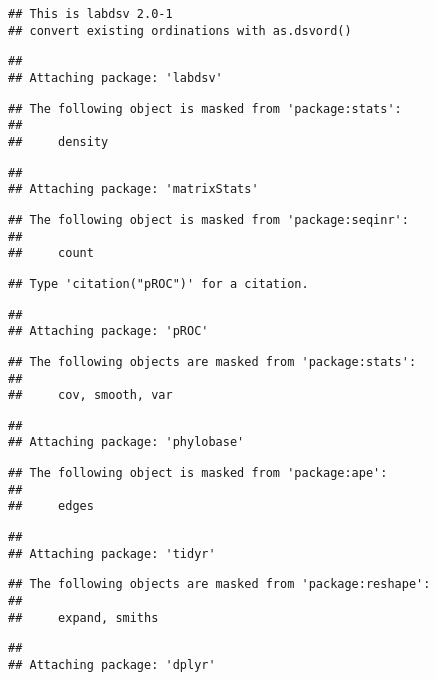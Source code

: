 \documentclass[
]{article}
\begin{document}
\begin{verbatim}
## This is labdsv 2.0-1
## convert existing ordinations with as.dsvord()
\end{verbatim}

\begin{verbatim}
## 
## Attaching package: 'labdsv'
\end{verbatim}

\begin{verbatim}
## The following object is masked from 'package:stats':
## 
##     density
\end{verbatim}

\begin{verbatim}
## 
## Attaching package: 'matrixStats'
\end{verbatim}

\begin{verbatim}
## The following object is masked from 'package:seqinr':
## 
##     count
\end{verbatim}

\begin{verbatim}
## Type 'citation("pROC")' for a citation.
\end{verbatim}

\begin{verbatim}
## 
## Attaching package: 'pROC'
\end{verbatim}

\begin{verbatim}
## The following objects are masked from 'package:stats':
## 
##     cov, smooth, var
\end{verbatim}

\begin{verbatim}
## 
## Attaching package: 'phylobase'
\end{verbatim}

\begin{verbatim}
## The following object is masked from 'package:ape':
## 
##     edges
\end{verbatim}

\begin{verbatim}
## 
## Attaching package: 'tidyr'
\end{verbatim}

\begin{verbatim}
## The following objects are masked from 'package:reshape':
## 
##     expand, smiths
\end{verbatim}

\begin{verbatim}
## 
## Attaching package: 'dplyr'
\end{verbatim}
\end{document}
